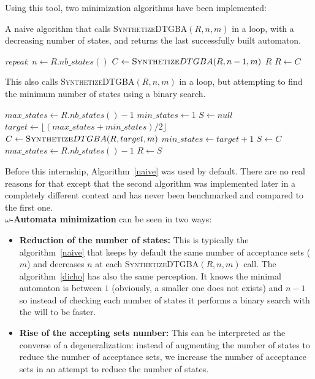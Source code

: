 \noindent Using this tool, two minimization algorithms have been implemented:
\begin{algorithm}[H]
 \caption{A naive algorithm that calls \textsc{Synthetize}DTGBA$(R,n,m)$ in a loop, with a decreasing
          number of states, and returns the last successfully built automaton.}
 \label{naive}
 \begin{algorithmic}[1]
   \BState \emph{repeat}:
   \State $n \gets R.nb\_states() $
   \State $C \gets \textsc{Synthetize}DTGBA(R,n-1,m) $
    \Return $R$\EndIf
   \State $R \gets C$
  \EndProcedure
 \end{algorithmic}
\end{algorithm}

\begin{algorithm}[H]
 \caption{This also calls \textsc{Synthetize}DTGBA$(R,n,m)$ in a loop, but attempting to find the minimum
          number of states using a binary search.}
 \label{dicho}
 \begin{algorithmic}[1]
   \State $max\_states \gets R.nb\_states()-1$
   \State $min\_states \gets 1$
   \State $S \gets null$
    \State $target \gets \lfloor(max\_states + min\_states) / 2\rfloor$
    \State $C \gets \textsc{Synthetize}DTGBA(R,target,m)$
     \State $min\_states \gets target + 1$
    \Else
     \State $S \gets C$
     \State $max\_states \gets R.nb\_states()-1$
    \EndIf
   \EndWhile
   \State $R \gets S$
  \EndProcedure
 \end{algorithmic}
\end{algorithm}

\noindent Before this internship, Algorithm~\ref{naive} was used by default. There are no real reasons for
that except that the second algorithm was implemented later in a completely different context and has never
been benchmarked and compared to the first one.\\

\noindent \textbf{$\omega$-Automata minimization} can be seen in two ways:
\begin{itemize}
 \item \textbf{Reduction of the number of states:}
       This is typically the algorithm~\ref{naive} that keeps by default the same number of acceptance sets
       ($m$) and decreases $n$ at each \textsc{Synthetize}DTGBA$(R,n,m)$ call. The algorithm~\ref{dicho}
       has also the same perception. It knows the minimal automaton is between $1$ (obviously, a smaller
       one does not exists) and $n-1$ so instead of checking each number of states it performs a binary
       search with the will to be faster.
 \item \textbf{Rise of the accepting sets number:}
       This can be interpreted as the converse of a degeneralization: instead of augmenting the number
       of states to reduce the number of acceptance sets, we increase the number of acceptance sets in
       an attempt to reduce the number of states.
\end{itemize}

